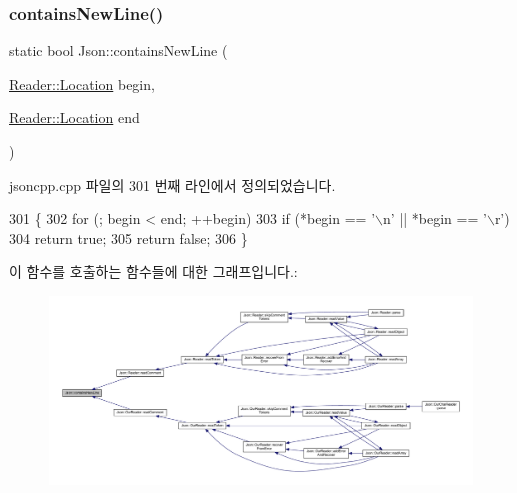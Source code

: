 \mbox{\label{namespace_json_a4d6ab0f651348832e5cc49b577a854d2}} 
\subsubsection{\texorpdfstring{contains\+New\+Line()}{containsNewLine()}}
{\footnotesize\ttfamily static bool Json\+::contains\+New\+Line (\begin{DoxyParamCaption}\item[{\hyperlink{class_json_1_1_reader_a46795b5b272bf79a7730e406cb96375a}{Reader\+::\+Location}}]{begin,  }\item[{\hyperlink{class_json_1_1_reader_a46795b5b272bf79a7730e406cb96375a}{Reader\+::\+Location}}]{end }\end{DoxyParamCaption})\hspace{0.3cm}{\ttfamily [static]}}



jsoncpp.\+cpp 파일의 301 번째 라인에서 정의되었습니다.


\begin{DoxyCode}
301                                                                       \{
302   \textcolor{keywordflow}{for} (; begin < end; ++begin)
303     \textcolor{keywordflow}{if} (*begin == \textcolor{charliteral}{'\(\backslash\)n'} || *begin == \textcolor{charliteral}{'\(\backslash\)r'})
304       \textcolor{keywordflow}{return} \textcolor{keyword}{true};
305   \textcolor{keywordflow}{return} \textcolor{keyword}{false};
306 \}
\end{DoxyCode}
이 함수를 호출하는 함수들에 대한 그래프입니다.\+:\nopagebreak
\begin{figure}[H]
\begin{center}
\leavevmode
\includegraphics[width=350pt]{namespace_json_a4d6ab0f651348832e5cc49b577a854d2_icgraph}
\end{center}
\end{figure}
\mbox{\label{namespace_json_aad8b4982c1acd164f541fba396ac9fb1}} 
